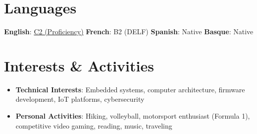 \documentclass[letterpaper,11pt]{article}
\newcommand{\resumeSubHeadingListStart}{\begin{itemize}[leftmargin=*]}
\newcommand{\resumeSubHeadingListEnd}{\end{itemize}}
\begin{document}

\section{Languages}
    {\textbf{English}}{: \href{https://media.licdn.com/dms/image/v2/D4D2DAQFv3v2vPQQRsQ/profile-treasury-image-shrink_8192_8192/profile-treasury-image-shrink_8192_8192/0/1702825935559?e=1759478400&v=beta&t=3rUZjLfbbDW-vxfRUDNeWk3CoQQWEIO_xsjrs9iV2T8}
    {C2 (Proficiency)}}
    \hfill\textbf{French}{: B2 (DELF)}
    \hfill\textbf{Spanish}{: Native}
    \hfill\textbf{Basque}{: Native}



\section{Interests \& Activities}
\resumeSubHeadingListStart
  \item{
    \textbf{Technical Interests}{: Embedded systems, computer architecture, firmware development, IoT platforms, cybersecurity}
    }
  \item{
    \textbf{Personal Activities}{: Hiking, volleyball, motorsport enthusiast (Formula 1), competitive video gaming, reading, music, traveling}
    }
\resumeSubHeadingListEnd

\end{document}
